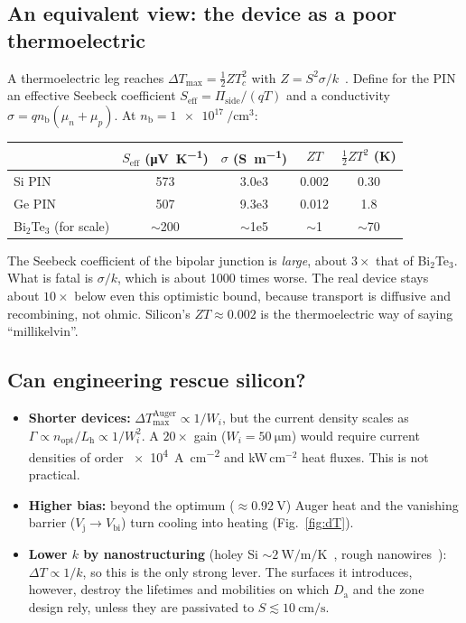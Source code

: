 \documentclass[11pt,a4paper]{article}
\newcommand{\Vj}{V_{\mathrm{j}}}
\newcommand{\Da}{D_{\mathrm{a}}}
\newcommand{\nb}{n_{\mathrm{b}}}
\newcommand{\Pis}{\Pi_{\mathrm{side}}}
\newcommand{\Lh}{L_{\mathrm{h}}}
\begin{document}
\subsection{An equivalent view: the device as a poor thermoelectric}
A thermoelectric leg reaches $\Delta T_{\max}=\tfrac12 ZT_c^2$ with $Z=S^2\sigma/k$~\cite{goldsmid}. Define for the PIN an effective Seebeck coefficient $S_{\mathrm{eff}}=\Pis/(qT)$ and a conductivity $\sigma=q\nb(\mu_n+\mu_p)$. At $\nb=\SI{1e17}{\per\centi\metre\cubed}$:
\begin{center}\small
\begin{tabular}{lcccc}
\toprule
 & $S_{\mathrm{eff}}$ (\si{\micro\volt\per\kelvin}) & $\sigma$ (\si{\siemens\per\metre}) & $ZT$ & $\tfrac12ZT^2$ (K) \\
\midrule
Si PIN & 573 & 3.0e3 & 0.002 & 0.30\\
Ge PIN & 507 & 9.3e3 & 0.012 & 1.8\\
Bi$_2$Te$_3$ (for scale) & $\sim$200 & $\sim$1e5 & $\sim$1 & $\sim$70\\
\bottomrule
\end{tabular}
\end{center}
The Seebeck coefficient of the bipolar junction is \emph{large}, about $3\times$ that of Bi$_2$Te$_3$. What is fatal is $\sigma/k$, which is about 1000 times worse. The real device stays about $10\times$ below even this optimistic bound, because transport is diffusive and recombining, not ohmic. Silicon's $ZT\approx0.002$ is the thermoelectric way of saying ``millikelvin''.

\subsection{Can engineering rescue silicon?}
\begin{itemize}
  \item \textbf{Shorter devices:} $\Delta T_{\max}^{\mathrm{Auger}}\propto1/W_i$, but the current density scales as $\Gamma\propto n_{\mathrm{opt}}/\Lh\propto1/W_i^2$. A $20\times$ gain ($W_i=\SI{50}{\micro\metre}$) would require current densities of order \SI{e4}{\ampere\per\centi\metre\squared} and kW\,cm$^{-2}$ heat fluxes. This is not practical.
  \item \textbf{Higher bias:} beyond the optimum ($\approx\SI{0.92}{\volt}$) Auger heat and the vanishing barrier ($\Vj\to V_{\mathrm{bi}}$) turn cooling into heating (Fig.~\ref{fig:dT}).
  \item \textbf{Lower $k$ by nanostructuring} (holey Si $\sim\SI{2}{\watt\per\metre\per\kelvin}$~\cite{tang2010}, rough nanowires~\cite{hochbaum}): $\Delta T\propto1/k$, so this is the only strong lever. The surfaces it introduces, however, destroy the lifetimes and mobilities on which $\Da$ and the zone design rely, unless they are passivated to $S\lesssim\SI{10}{\centi\metre\per\second}$.
\end{itemize}
\end{document}
